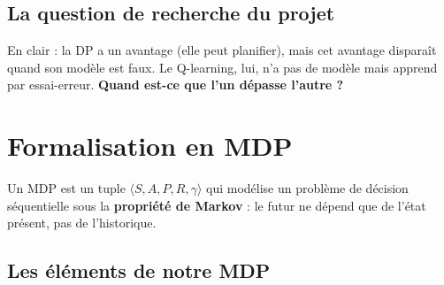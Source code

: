 \documentclass[11pt,a4paper]{article}
\begin{document}
\subsection{La question de recherche du projet}

\begin{center}
\end{center}

En clair : la DP a un avantage (elle peut planifier), mais cet avantage disparaît quand son modèle est faux. Le Q-learning, lui, n'a pas de modèle mais apprend par essai-erreur. \textbf{Quand est-ce que l'un dépasse l'autre ?}

\section{Formalisation en MDP}
\label{sec:mdp}

\begin{defbox}[Compétences C4, C5]
Un MDP est un tuple $\langle S, A, P, R, \gamma \rangle$ qui modélise un problème de décision séquentielle sous la \textbf{propriété de Markov} : le futur ne dépend que de l'état présent, pas de l'historique.
\end{defbox}

\subsection{Les éléments de notre MDP}
\end{document}
